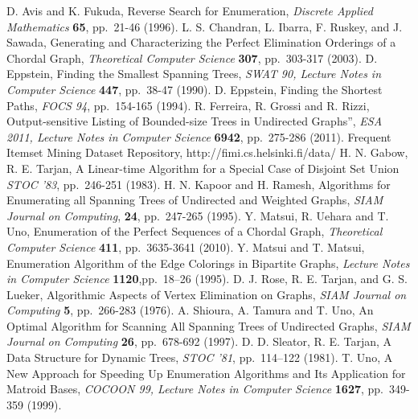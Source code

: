 \documentclass{llncs}
\begin{document}
\vspace{-3mm}
\begin{thebibliography}{99}
\vspace{-4mm}
 D. Avis and K. Fukuda, 
  Reverse Search for Enumeration,
  {\it Discrete Applied Mathematics} {\bf 65}, pp.~21-46 (1996).
 L. S. Chandran, L. Ibarra, F. Ruskey, and J. Sawada, 
  Generating and Characterizing the Perfect Elimination Orderings of a
  Chordal Graph,
  {\it Theoretical Computer Science} {\bf 307}, pp.~303-317 (2003).
 D. Eppstein,
  Finding the  Smallest Spanning Trees,
  {\it SWAT 90, Lecture Notes in Computer Science} {\bf 447}, pp.~38-47 (1990).
 D. Eppstein,
  Finding the  Shortest Paths,
  {\it FOCS 94}, pp.~154-165 (1994).
 R. Ferreira, R. Grossi and R. Rizzi,
  Output-sensitive Listing of Bounded-size Trees in Undirected Graphs'',
  {\it ESA 2011, Lecture Notes in Computer Science} {\bf 6942},
   pp.~275-286 (2011).
 Frequent Itemset Mining Dataset Repository, http://fimi.cs.helsinki.fi/data/
 H. N. Gabow, R. E. Tarjan,
  A Linear-time Algorithm for a Special Case of Disjoint Set Union
  {\it STOC '83}, pp.~246-251 (1983).
 H. N. Kapoor and H. Ramesh, 
  Algorithms for Enumerating all Spanning Trees of Undirected and Weighted
  Graphs,
  {\it SIAM Journal on Computing}, {\bf 24}, pp.~247-265 (1995).
 Y. Matsui, R. Uehara and T. Uno,
  Enumeration of the Perfect Sequences of a Chordal Graph,
  {\it Theoretical Computer Science} {\bf411}, pp.~3635-3641 (2010).
 Y. Matsui and T. Matsui,
  Enumeration Algorithm of the Edge Colorings in Bipartite Graphs,
  {\it Lecture Notes in Computer Science} {\bf 1120},pp.~18--26 (1995).
 D. J. Rose, R. E. Tarjan, and G. S. Lueker,
  Algorithmic Aspects of Vertex Elimination on Graphs,
  {\it SIAM Journal on Computing} {\bf 5}, pp.~266-283 (1976).
 A. Shioura, A. Tamura and T. Uno, 
  An Optimal Algorithm for Scanning All Spanning Trees of Undirected Graphs,
  {\it SIAM Journal on Computing} {\bf 26}, pp.~678-692 (1997).
 D. D. Sleator, R. E. Tarjan, 
  A Data Structure for Dynamic Trees, 
  {\it STOC '81}, pp.~114--122 (1981).
 T. Uno, 
  A New Approach for Speeding Up Enumeration Algorithms and Its Application
  for Matroid Bases, {\it COCOON 99,
  Lecture Notes in Computer Science} {\bf 1627}, pp.~349-359 (1999).

\end{thebibliography}
\end{document}
